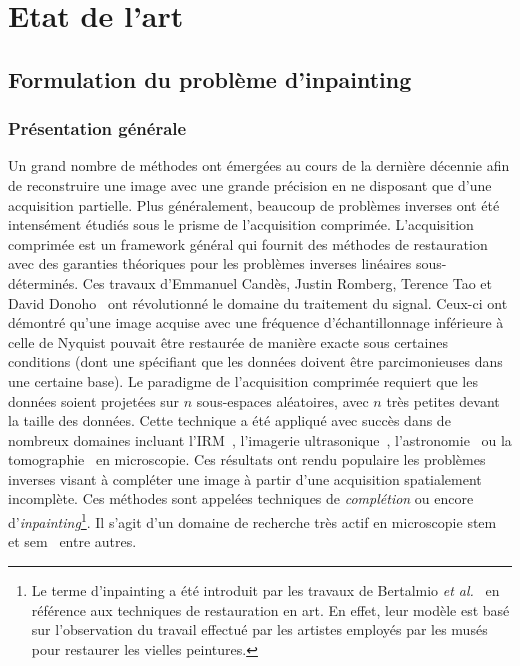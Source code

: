 \chapter{Etat de l'art}
\dochaptoc
\label{ch-chapter_2}

%
\section{Formulation du problème d'inpainting}

\subsection{Présentation générale}

Un grand nombre de méthodes ont émergées au cours de la dernière décennie afin de reconstruire une image avec une grande précision en ne disposant que d'une acquisition partielle. Plus généralement, beaucoup de problèmes inverses ont été intensément étudiés sous le prisme de l'acquisition comprimée. L'acquisition comprimée est un framework général qui fournit des méthodes de restauration avec des garanties théoriques pour les problèmes inverses linéaires sous-déterminés. Ces travaux d'Emmanuel Candès, Justin Romberg, Terence Tao et David Donoho~\cite{candes2006near, candes2006stable, donoho2006compressed} ont révolutionné le domaine du traitement du signal. Ceux-ci ont démontré qu'une image acquise avec une fréquence d'échantillonnage inférieure à celle de Nyquist pouvait être restaurée de manière exacte sous certaines conditions (dont une spécifiant que les données doivent être parcimonieuses dans une certaine base). Le paradigme de l'acquisition comprimée requiert que les données soient projetées sur $n$ sous-espaces aléatoires, avec $n$ très petites devant la taille des données. Cette technique a été appliqué avec succès dans de nombreux domaines incluant l'IRM~\cite{boyer_algorithm_2014}, l'imagerie ultrasonique~\cite{quinsac_bayesian_2011}, l'astronomie~\cite{bobin_compressed_2008} ou la tomographie~\cite{binev2012compressed, jacob2019MM, jacob2018MM} en microscopie. %
%
Ces résultats ont rendu populaire les problèmes inverses visant à compléter une image à partir d'une acquisition spatialement incomplète. Ces méthodes sont appelées techniques de \emph{complétion} ou encore d'\emph{inpainting}\footnote{Le terme d'inpainting a été introduit par les travaux de Bertalmio \textit{et al.}~\cite{bertalmio2000image} en référence aux techniques de restauration en art. En effet, leur modèle est basé sur l'observation du travail effectué par les artistes employés par les musés pour restaurer les vielles peintures.}. Il s'agit d'un domaine de recherche très actif en microscopie \gls{stem}~\cite{beche2016compressed,stevens2014potential} et \gls{sem}~\cite{anderson2013sparse} entre autres.

